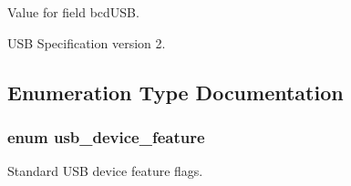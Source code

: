 Value for field bcd\-U\-S\-B. 

U\-S\-B Specification version 2. 

\subsection{Enumeration Type Documentation}
\hypertarget{group__usb__protocol__group_gab9975b89ad7079085d0300eab037c3ac}{
\subsubsection[{usb\-\_\-device\-\_\-feature}]{\setlength{\rightskip}{0pt plus 5cm}enum {\bf usb\-\_\-device\-\_\-feature}}}\label{group__usb__protocol__group_gab9975b89ad7079085d0300eab037c3ac}


Standard U\-S\-B device feature flags. 

